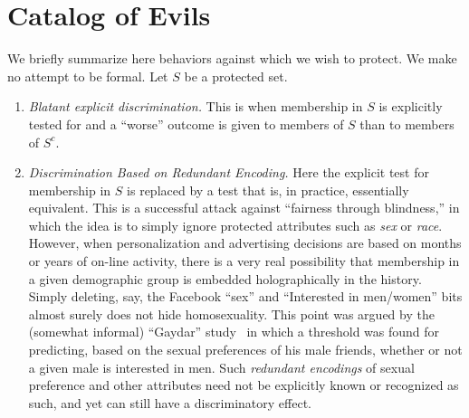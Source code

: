 \documentclass[letterpaper,11pt]{article}
\theoremstyle{definition}
\newcommand{\Scomp}{S^c}
\begin{document}



\appendix

\section{Catalog of Evils}
\label{sec:taxonomy}
We briefly summarize here behaviors against which we wish to protect.
We make no attempt to be formal.
Let $S$ be a protected set.
\begin{enumerate}
\item
{\em Blatant explicit discrimination.}  This is when membership in $S$
is explicitly tested for and a ``worse'' outcome is given to members of
$S$ than to members of $\Scomp$.
\item
{\em Discrimination Based on Redundant Encoding.}  Here the explicit
test for membership in $S$ is replaced by a test that is, in practice,
essentially equivalent.  This is a successful attack against
``fairness through blindness,'' in which
the idea is to simply ignore protected attributes such as \emph{sex} or
\emph{race}. However, when 
personalization and advertising decisions are based on
months or years of on-line activity, there is a very real possibility that
membership in a given demographic group is embedded holographically in the
history.  Simply deleting, say, the Facebook ``sex'' and ``Interested in
men/women'' bits almost surely does not hide homosexuality.  This point was
argued by the (somewhat informal) ``Gaydar'' study~\cite{gaydar} in which a
threshold was found for predicting, based on the sexual preferences of his
male friends, whether or not a given male is interested in men.
Such {\em redundant encodings} of sexual preference and other attributes need
not be explicitly known or recognized as such, and yet can still have a
discriminatory effect.



\end{enumerate}
\end{document}

